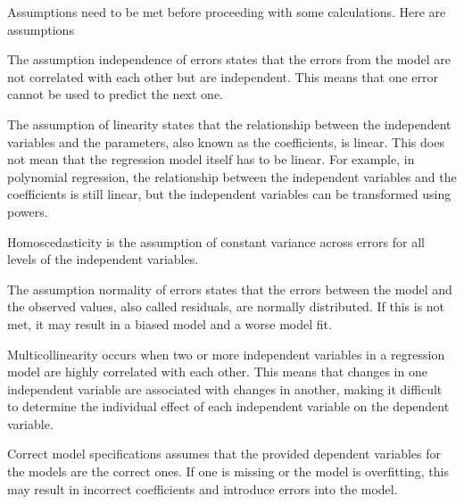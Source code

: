 Assumptions need to be met before proceeding with some calculations. Here are assumptions
\newline 

The assumption independence of errors states that the errors from the model are not correlated with each other but are independent. This means that one error cannot be used to predict the next one. \newline


 The assumption of linearity states that the relationship between the independent variables and the parameters, also known as the coefficients, is linear. This does not mean that the regression model itself has to be linear. For example, in polynomial regression, the relationship between the independent variables and the coefficients is still linear, but the independent variables can be transformed using powers.\newline


Homoscedasticity is the assumption of constant variance across errors for all levels of the independent variables. \newline

The assumption normality of errors states that the errors between the model and the observed values, also called residuals, are normally distributed. If this is not met, it may result in a biased model and a worse model fit. \newline


Multicollinearity occurs when two or more independent variables in a regression model are highly correlated with each other. This means that changes in one independent variable are associated with changes in another, making it difficult to determine the individual effect of each independent variable on the dependent variable. \newline

Correct model specifications assumes that the provided dependent variables for the models are the correct ones. If one is missing or the model is overfitting, this may result in incorrect coefficients and introduce errors into the model.

